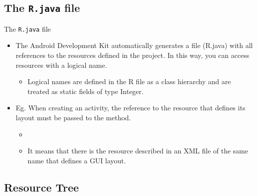 \documentclass{beamer}
\begin{document}
\subsection{The \texttt{R.java} file}
  \begin{frame}{The \texttt{R.java} file}
    \begin{itemize}\itemsep10pt
      \item The Android Development Kit automatically generates a file (R.java)
      with all references to the resources defined in the project. In this way,
      you can access resources with a logical name.
      \begin{itemize}
        \item Logical names are defined in the R file as a class hierarchy and
        are treated as static fields of type Integer.
      \end{itemize}
      \item Eg. When creating an activity, the reference to the resource that
      defines its layout must be passed to the  method.
      \begin{itemize}
        \item {} 
        \item It means that there is the  resource
        described in an XML file of the same name that defines a GUI layout.
      \end{itemize}
    \end{itemize}
  \end{frame}

\subsection{Resource Tree}
\end{document}
